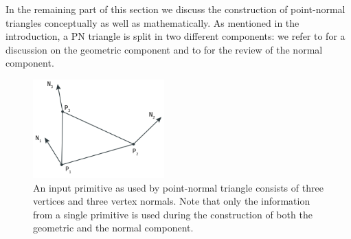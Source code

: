 In the remaining part of this section we discuss the construction of point-normal triangles conceptually as well as mathematically. As mentioned in the introduction, a PN triangle is split in two different components: we refer to  for a discussion on the geometric component and to  for the review of the normal component.

\begin{figure}
	\centering
	\includegraphics[width=0.45\textwidth]{./content/img/method/input.png}
	\caption{An input primitive as used by point-normal triangle consists of three vertices and three vertex normals. Note that only the information from a single primitive is used during the construction of both the geometric and the normal component.}
	\label{fig:method:input_primitive}
\end{figure}




